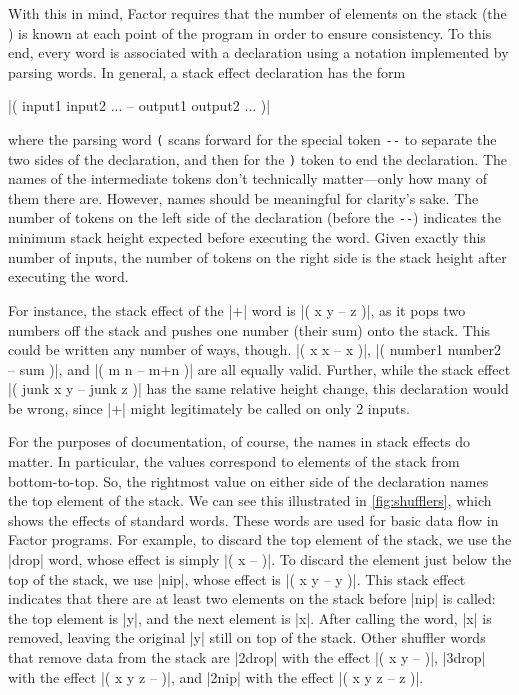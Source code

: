 With this in mind, Factor requires that the number of elements on the stack
(the ) is known at each point of the program in order to
ensure consistency.  To this end, every word is associated with a  declaration using a notation implemented by parsing words.  In general,
a stack effect declaration has the form
%
\begin{center} \factor|( input1 input2 ... -- output1 output2 ... )|
\end{center}
%
where the parsing word \Verb|(| scans forward for the special token \Verb|--|
to separate the two sides of the declaration, and then for the \Verb|)| token
to end the declaration.  The names of the intermediate tokens don't technically
matter---only how many of them there are.  However, names should be meaningful
for clarity's sake.  The number of tokens on the left side of the declaration
(before the \Verb|--|) indicates the minimum stack height expected before
executing the word.  Given exactly this number of inputs, the number of tokens
on the right side is the stack height after executing the word.

For instance, the stack effect of the \factor|+| word is
%
\factor|( x y -- z )|,
%
as it pops two numbers off the stack and pushes one number (their sum) onto the
stack.  This could be written any number of ways, though.
%
\factor|( x x -- x )|,
%
\factor|( number1 number2 -- sum )|,
%
and
%
\factor|( m n -- m+n )|
%
are all equally valid.  Further, while the stack effect
%
\factor|( junk x y -- junk z )|
%
has the same relative height change, this declaration would be wrong, since
\factor|+| might legitimately be called on only $2$ inputs.


For the purposes of documentation, of course, the names in stack effects do
matter.  In particular, the values correspond to elements of the stack from
bottom-to-top.  So, the rightmost value on either side of the declaration names
the top element of the stack.  We can see this illustrated in
\vref{fig:shufflers}, which shows the effects of standard 
words.  These words are used for basic data flow in Factor programs.  For
example, to discard the top element of the stack, we use the \factor|drop|
word, whose effect is simply
%
\factor|( x -- )|.
%
To discard the element just below the top of the stack, we use \factor|nip|,
whose effect is
%
\factor|( x y -- y )|.
%
This stack effect indicates that there are at least two elements on the stack
before \factor|nip| is called: the top element is \factor|y|, and the next
element is \factor|x|.  After calling the word, \factor|x| is removed, leaving
the original \factor|y| still on top of the stack.  Other shuffler words that
remove data from the stack are
%
\factor|2drop| with the effect \factor|( x y -- )|,
%
\factor|3drop| with the effect \factor|( x y z -- )|, and
%
\factor|2nip| with the effect \factor|( x y z -- z )|.

